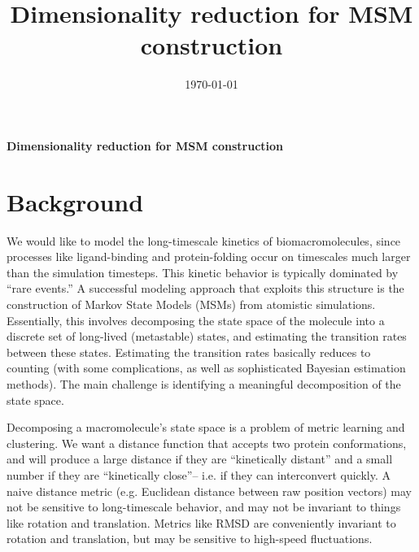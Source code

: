 \documentclass[aps,prl,preprint,nofootinbib,superscriptaddress,linenumbers]{revtex4-1}
\begin{document}

\title{Dimensionality reduction for MSM construction}
\date{\today}




\begin{center}
\textbf{Dimensionality reduction for MSM construction}
\end{center}

\section{Background}
We would like to model the long-timescale kinetics of biomacromolecules, since processes like ligand-binding and protein-folding occur on timescales much larger than the simulation timesteps.
This kinetic behavior is typically dominated by ``rare events.''
A successful modeling approach that exploits this structure is the construction of Markov State Models (MSMs) from atomistic simulations.
Essentially, this involves decomposing the state space of the molecule into a discrete set of long-lived (metastable) states, and estimating the transition rates between these states.
Estimating the transition rates basically reduces to counting (with some complications, as well as sophisticated Bayesian estimation methods).
The main challenge is identifying a meaningful decomposition of the state space.

Decomposing a macromolecule's state space is a problem of metric learning and clustering. We want a distance function that accepts two protein conformations, and will produce a large distance if they are ``kinetically distant'' and a small number if they are ``kinetically close''-- i.e. if they can interconvert quickly. A naive distance metric (e.g. Euclidean distance between raw position vectors) may not be sensitive to long-timescale behavior, and may not be invariant to things like rotation and translation. Metrics like RMSD are conveniently invariant to rotation and translation, but may be sensitive to high-speed fluctuations.
\end{document}
